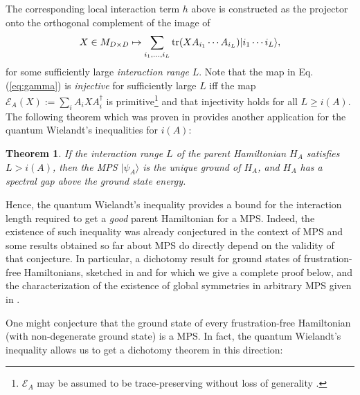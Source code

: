 \documentclass[journal,twoside]{IEEEtran}
\newtheorem{theorem}{Theorem}
\newcommand{\1}{\mathbbm{1}}
\def\E{{\cal E}}
\renewcommand{\>}{\rangle}
\newcommand{\<}{\langle}
\def\E{\mathcal{E}}
\begin{document}
The corresponding local interaction term $h$ above is constructed as
the projector onto the orthogonal complement of the image of
\begin{equation}
\label{eq:gamma}X\in M_{D\times D}\mapsto
\sum_{i_1,\ldots, i_L}{\rm tr}(XA_{i_1}\cdots A_{i_L})|i_1\cdots
i_L\>,
\end{equation}
for some sufficiently large \emph{interaction range} $L$. Note that
the map in Eq.(\ref{eq:gamma}) is \emph{injective} for sufficiently
large $L$ iff the map $\E_A(X):=\sum_iA_iXA_i^\dagger$ is
primitive\footnote{$\E_A$ may be assumed to be trace-preserving
without loss of generality \cite{PVWC07}.} and that injectivity holds for all
$L\geq i(A)$. The following theorem which was proven in
\cite{FNW92,PVWC07} provides another application for the quantum
Wielandt's inequalities for $i(A)$:
\begin{theorem}
If the interaction range $L$ of the parent Hamiltonian $H_A$
satisfies $L>i(A)$, then the MPS $|\psi_A\>$ is the unique ground of
$H_A$, and $H_A$ has a spectral gap above the ground state energy.
\end{theorem}
Hence, the quantum Wielandt's inequality provides a bound for the
interaction length required to get a {\it good} parent Hamiltonian
for a MPS. Indeed, the existence of such inequality was already
conjectured in the context of MPS \cite[Conjectures 1 and 2]{PVWC07}
and some results obtained so far about MPS do directly depend on the
validity of that conjecture. In particular, a dichotomy result for
ground states of frustration-free Hamiltonians, sketched in
\cite{PVWC07} and for which we give a complete proof below, and the
characterization of the existence of global symmetries in arbitrary
MPS given in \cite{SWPC09}.

One might conjecture that the ground state of every frustration-free
Hamiltonian (with non-degenerate ground state) is a MPS. In fact,
the quantum Wielandt's inequality allows us to get a dichotomy
theorem in this direction:
\end{document}
